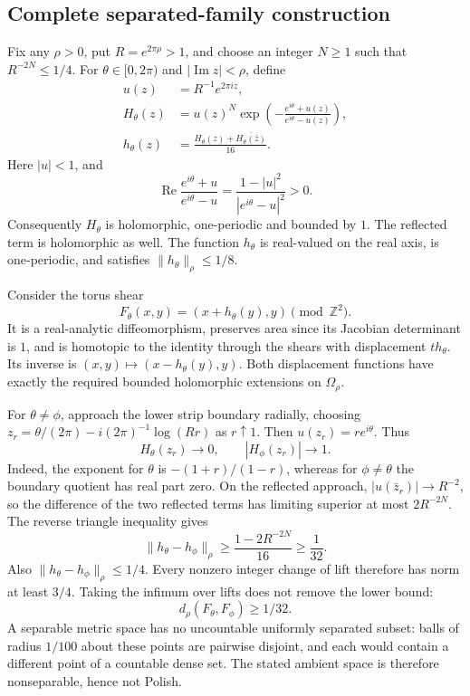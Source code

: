 \documentclass[10pt]{article}
\begin{document}
\subsection*{Complete separated-family construction}
Fix any \(\rho>0\), put \(R=e^{2\pi\rho}>1\), and choose an integer \(N\ge1\) such that \(R^{-2N}\le1/4\). For \(\theta\in[0,2\pi)\) and \(|\operatorname{Im}z|<\rho\), define \[\begin{aligned}
 u(z)&=R^{-1}e^{2\pi iz},\\
 H_\theta(z)&=u(z)^N
 \exp\left(-\frac{e^{i\theta}+u(z)}{e^{i\theta}-u(z)}\right),\\
 h_\theta(z)&=\frac{H_\theta(z)+\overline{H_\theta(\bar z)}}{16}.\end{aligned}\] Here \(|u|<1\), and \[\operatorname{Re}\frac{e^{i\theta}+u}{e^{i\theta}-u}
 =\frac{1-|u|^2}{|e^{i\theta}-u|^2}>0.\] Consequently \(H_\theta\) is holomorphic, one-periodic and bounded by \(1\). The reflected term is holomorphic as well. The function \(h_\theta\) is real-valued on the real axis, is one-periodic, and satisfies \(\|h_\theta\|_\rho\le1/8\).\par
Consider the torus shear \[F_\theta(x,y)=(x+h_\theta(y),y)\pmod{\mathbb Z^2}.\] It is a real-analytic diffeomorphism, preserves area since its Jacobian determinant is \(1\), and is homotopic to the identity through the shears with displacement \(t h_\theta\). Its inverse is \((x,y)\mapsto(x-h_\theta(y),y)\). Both displacement functions have exactly the required bounded holomorphic extensions on \(\Omega_\rho\).\par
For \(\theta\ne\phi\), approach the lower strip boundary radially, choosing \(z_r=\theta/(2\pi)-i(2\pi)^{-1}\log(Rr)\) as \(r\uparrow1\). Then \(u(z_r)=r e^{i\theta}\). Thus \[H_\theta(z_r)\longrightarrow0,\qquad
 |H_\phi(z_r)|\longrightarrow1 .\] Indeed, the exponent for \(\theta\) is \(-(1+r)/(1-r)\), whereas for \(\phi\ne\theta\) the boundary quotient has real part zero. On the reflected approach, \(|u(\bar z_r)|\to R^{-2}\), so the difference of the two reflected terms has limiting superior at most \(2R^{-2N}\). The reverse triangle inequality gives \[\|h_\theta-h_\phi\|_\rho
 \ge \frac{1-2R^{-2N}}{16}\ge\frac1{32}.\] Also \(\|h_\theta-h_\phi\|_\rho\le1/4\). Every nonzero integer change of lift therefore has norm at least \(3/4\). Taking the infimum over lifts does not remove the lower bound: \[d_\rho(F_\theta,F_\phi)\ge1/32 .\] A separable metric space has no uncountable uniformly separated subset: balls of radius \(1/100\) about these points are pairwise disjoint, and each would contain a different point of a countable dense set. The stated ambient space is therefore nonseparable, hence not Polish.\par
\end{document}
